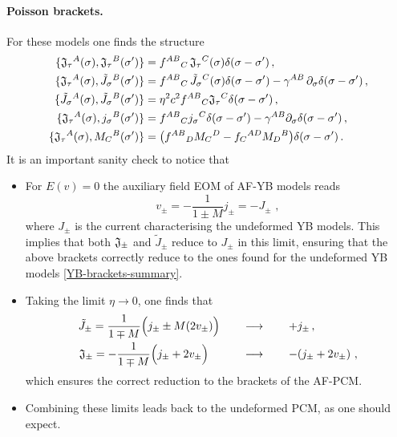 \documentclass[12pt]{article}
\numberwithin{equation}{section}
\begin{document}
\paragraph{Poisson brackets.}
For these models one finds the structure
\begin{align}\label{AF-YB-brackets-summary}
\{ \mathfrak{J}_{\tau}{}^{A}(\sigma),\mathfrak{J}_{\tau}{}^{B}(\sigma') \} &= f^{AB}{}_{C} \, \mathfrak{J}_{\tau}{}^{C}(\sigma)\delta(\sigma-\sigma') \, ,
\notag \\
\{ \mathfrak{J}_{\tau}{}^{A}(\sigma),\tilde{J}_{\sigma}{}^{B}(\sigma') \} &= f^{AB}{}_{C} \, \tilde{J}_{\sigma}{}^{C}(\sigma)\delta(\sigma-\sigma')-\gamma^{AB} \, \partial_{\sigma}\delta(\sigma-\sigma') \, ,
\notag \\
\{ \tilde{J}_{\sigma}{}^{A}(\sigma),\tilde{J}_{\sigma}{}^{B}(\sigma') \} &= \eta^2 c^2 f^{AB}{}_{C}\mathfrak{J}_{\tau}{}^{C}\delta(\sigma-\sigma') \, ,
\\
\{ \mathfrak{J}_{\tau}{}^{A}(\sigma),j_{\sigma}{}^{B}(\sigma') \} &= f^{AB}{}_{C}j_{\sigma}{}^{C}\delta(\sigma-\sigma')-\gamma^{AB}\partial_{\sigma}\delta(\sigma-\sigma') \, ,
\notag \\
\{ \mathfrak{J}_{\tau}{}^{A}(\sigma),M_{C}{}^{B}(\sigma') \} &= \bigl(f^{AB}{}_{D}M_{C}{}^{D}-f_{C}{}^{AD}M_{D}{}^{B}\bigr)\delta(\sigma-\sigma') \, .
\notag
\end{align}
It is an important sanity check to notice that
\begin{itemize}
\item For $E(v)=0$ the auxiliary field EOM of AF-YB models reads
\begin{equation}
v_{\pm}=-\frac{1}{1\pm M}j_{\pm} = -J_{\pm} \,\, ,
\end{equation}
where $J_{\pm}$ is the current characterising the undeformed YB models. This implies that both $\frak{J}_{\pm}$ and $\tilde{J}_{\pm}$ reduce to $J_{\pm}$ in this limit, ensuring that the above brackets correctly reduce to the ones found for the undeformed YB models \eqref{YB-brackets-summary}.
\item Taking the limit $\eta\rightarrow0$, one finds that 
\begin{equation}
\begin{aligned}
\tilde{J}_{\pm}=\frac{1}{1\mp M}\Bigl( j_{\pm}\pm M(2v_{\pm}) \Bigr) &\qquad \longrightarrow \qquad +j_{\pm} \, ,
\\
\mathfrak{J}_{\pm}=-\frac{1}{1\mp M}\Bigl( j_{\pm}+2v_{\pm}\Bigr)\quad&\qquad\longrightarrow\qquad-(j_{\pm}+2v_{\pm}) \,\, ,
\end{aligned}
\end{equation}
which ensures the correct reduction to the brackets of the AF-PCM.
\item Combining these limits leads back to the undeformed PCM, as one should expect.
\end{itemize} 
\end{document}
